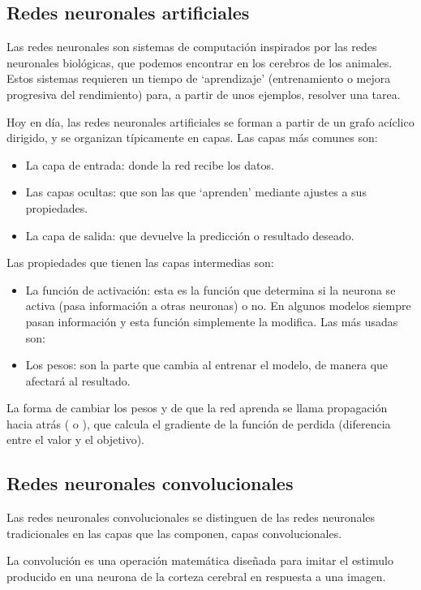 \subsection{Redes neuronales artificiales}

Las redes neuronales son sistemas de computación inspirados por las redes neuronales biológicas, que podemos encontrar en los cerebros de los animales. Estos sistemas requieren un tiempo de `aprendizaje' (entrenamiento o mejora progresiva del rendimiento) para, a partir de unos ejemplos, resolver una tarea.

Hoy en día, las redes neuronales artificiales se forman a partir de un grafo acíclico dirigido, y se organizan típicamente en capas. Las capas más comunes son: 
\begin{itemize}
\item La capa de entrada: donde la red recibe los datos.
\item Las capas ocultas: que son las que `aprenden' mediante ajustes a sus propiedades.
\item La capa de salida: que devuelve la predicción o resultado deseado.
\end{itemize}

Las propiedades que tienen las capas intermedias son:

\begin{itemize}
\item La función de activación: esta es la función que determina si la neurona se activa (pasa información a otras neuronas) o no. En algunos modelos siempre pasan información y esta función simplemente la modifica. Las más usadas son: 
\item Los pesos: son la parte que cambia al entrenar el modelo, de manera que afectará al resultado.
\end{itemize}

La forma de cambiar los pesos y de que la red aprenda se llama propagación hacia atrás ( o ), que calcula el gradiente de la función de perdida (diferencia entre el valor y el objetivo). 

\subsection{Redes neuronales convolucionales}
Las redes neuronales convolucionales se distinguen de las redes neuronales tradicionales en las capas que las componen, capas convolucionales.

La convolución es una operación matemática diseñada para imitar el estimulo producido en una neurona de la corteza cerebral en respuesta a una imagen.


